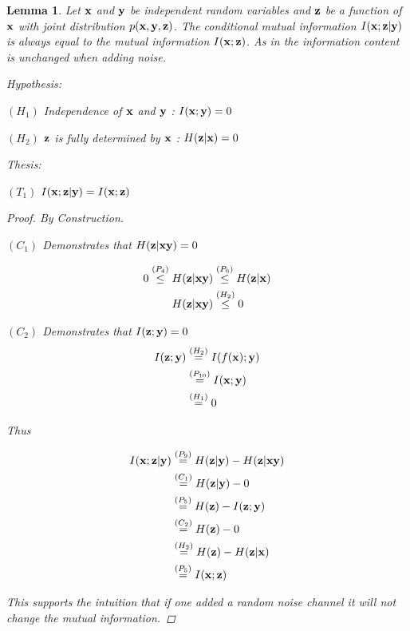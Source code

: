 \documentclass[letterpaper]{article} %
\theoremstyle{plain}
\newtheorem{lemma}[theorem]{Lemma}
\theoremstyle{definition}
\theoremstyle{remark}
\begin{document}
\begin{lemma}
Let ${\mathbf{x}}$ and ${\mathbf{y}}$ be independent random variables and ${\mathbf{z}}$ be a function of ${\mathbf{x}}$ with joint distribution $p({\mathbf{x}}, {\mathbf{y}}, {\mathbf{z}})$. The conditional mutual information $I({\mathbf{x}}; {\mathbf{z}}| {\mathbf{y}})$ is always equal to the mutual information $I({\mathbf{x}}; {\mathbf{z}})$. As in the information content is unchanged when adding noise. 

Hypothesis:

$(H_1)$ Independence of ${\mathbf{x}}$ and ${\mathbf{y}}$ : $I({\mathbf{x}};{\mathbf{y}}) = 0$

$(H_2)$  ${\mathbf{z}}$ is fully determined by ${\mathbf{x}}$ : $H({\mathbf{z}}|{\mathbf{x}}) = 0$

Thesis: 

$(T_1)$ $I({\mathbf{x}}; {\mathbf{z}}| {\mathbf{y}}) = I({\mathbf{x}}; {\mathbf{z}})$ 

\begin{proof}
    By Construction. 

    $(C_1)$ Demonstrates that $H({\mathbf{z}}| {\mathbf{x}} {\mathbf{y}}) = 0$

    $$
\begin{aligned}
0 \stackrel{\left(P_4\right)}{\leq} H({\mathbf{z}}|{\mathbf{x}} {\mathbf{y}})&\stackrel{\left(P_6\right)}{\leq}H({\mathbf{z}}|{\mathbf{x}})\\
H({\mathbf{z}}|{\mathbf{x}} {\mathbf{y}})&\stackrel{\left(H_2\right)}{\leq} 0
\end{aligned}
$$

    $(C_2)$ Demonstrates that $I({\mathbf{z}};{\mathbf{y}}) = 0$ 
    $$
\begin{aligned}
I({\mathbf{z}}; {\mathbf{y}})&\stackrel{\left(H_2\right)}{=}I(f({\mathbf{x}});{\mathbf{y}})\\
&\stackrel{\left(P_{10}\right)}{=}I({\mathbf{x}} ; {\mathbf{y}})\\
&\stackrel{\left(H_{1}\right)}{=}0\\
\end{aligned}
$$
    
    
Thus 

    $$
\begin{aligned}
I({\mathbf{x}}; {\mathbf{z}}| {\mathbf{y}}) &\stackrel{\left(P_9\right)}{=} H({\mathbf{z}}|{\mathbf{y}}) - H({\mathbf{z}}|{\mathbf{x}} {\mathbf{y}})\\
&\stackrel{\left(C_1\right)}{=} H({\mathbf{z}}| {\mathbf{y}})- 0\\
&\stackrel{\left(P_5\right)}{=} H({\mathbf{z}}) - I({\mathbf{z}}; {\mathbf{y}}) \\
&\stackrel{\left(C_2\right)}{=}H({\mathbf{z}}) - 0 \\
&\stackrel{\left(H_2\right)}{=}H({\mathbf{z}}) - H({\mathbf{z}}| {\mathbf{x}}) \\
&\stackrel{\left(P_5\right)}{=}I({\mathbf{x}}; {\mathbf{z}})
\end{aligned}
$$
    
This supports the intuition that if one added a random noise channel it will not change the mutual information. 

\end{proof}
\label{infonoise}
\end{lemma}
\end{document}

